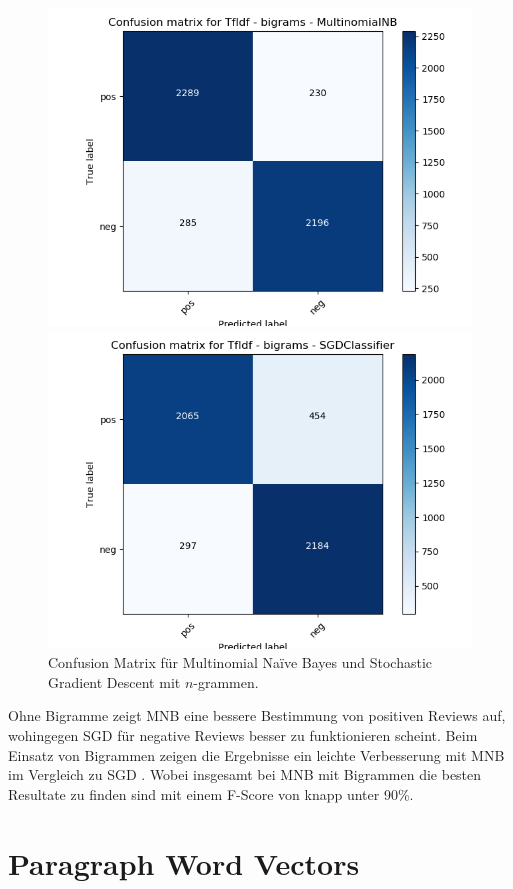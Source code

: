 \documentclass[12pt]{scrartcl}
\begin{document}
        \begin{figure}[h]
    	\begin{minipage}{0.45\textwidth}
    		\includegraphics[scale=.35]{pictures/tfidf_b_mnb.png}
    	\end{minipage}
    	\hfill
    	\begin{minipage}{0.45\textwidth}
    		\includegraphics[scale=.35]{pictures/tfidf_b_sgd.png}
    	\end{minipage}
    	\caption{Confusion Matrix für Multinomial Naïve Bayes und Stochastic Gradient Descent mit $n$-grammen.}
    \end{figure}

    Ohne Bigramme zeigt MNB eine bessere Bestimmung von positiven Reviews auf, wohingegen SGD für negative Reviews besser zu funktionieren scheint.
    Beim Einsatz von Bigrammen zeigen die Ergebnisse ein leichte Verbesserung mit MNB im Vergleich zu SGD .
    Wobei insgesamt bei MNB mit Bigrammen die besten Resultate zu finden sind mit einem F-Score von knapp unter 90\%.

    \section{Paragraph Word Vectors}\label{sec:paragraphWordVectors}
\end{document}
